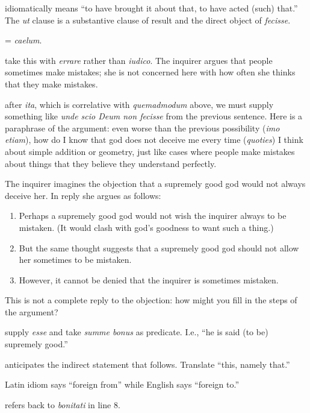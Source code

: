  idiomatically means ``to have brought it about that, to have acted (such) that.'' The \textit{ut} clause is a substantive clause of result and the direct object of \textit{fecisse}.

 = \textit{caelum}.

 take this with \textit{errare} rather than \textit{iudico}. The inquirer argues that people sometimes make mistakes; she is not concerned here with how often she thinks that they make mistakes.

 after \textit{ita}, which is correlative with \textit{quemadmodum} above, we must supply something like \textit{unde scio Deum non fecisse} from the previous sentence. Here is a paraphrase of the argument: even worse than the previous possibility (\textit{imo etiam}), how do I know that god does not deceive me every time (\textit{quoties}) I think about simple addition or geometry, just like cases where people make mistakes about things that they believe they understand perfectly.

 The inquirer imagines the objection that a supremely good god would not always deceive her. In reply she argues as follows:

\begin{enumerate}
    \item Perhaps a supremely good god would not wish the inquirer always to be mistaken. (It would clash with god's goodness to want such a thing.)
    \item But the same thought suggests that a supremely good god should not allow her sometimes to be mistaken.
    \item However, it cannot be denied that the inquirer is sometimes mistaken.
\end{enumerate}

This is not a complete reply to the objection: how might you fill in the steps of the argument?

 supply \textit{esse} and take \textit{summe bonus} as predicate. I.e., ``he is said (to be) supremely good.''

 anticipates the indirect statement that follows. Translate ``this, namely that.''

 Latin idiom says ``foreign from'' while English says ``foreign to.''

 refers back to \textit{bonitati} in line 8.

